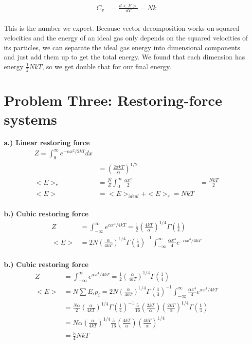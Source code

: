 \documentclass[10pt]{article} %
\begin{document}
\begin{align*}
  C_v &= \frac{d<E>}{dT} = Nk\\
\end{align*}

This is the number we expect. Because vector decomposition works on squared velocities and the
energy of an ideal gas only depends on the squared velocities of its particles, we can separate
the ideal gas energy into dimensional components and just add them up to get the total energy.
We found that each dimension has energy $\frac{1}{2}NkT$, so we get double that for our final
energy.\\

\section{Problem Three: Restoring-force systems}

\textbf{a.) Linear restoring force}
\begin{align*}
  Z = \int_0^\infty e^{-\alpha x^2/2kT}dx\\
  &= \left(\frac{2\pi kT}{\alpha}\right)^{1/2}\\
  <E>_r &= \frac{N}{Z}\int_0^\infty \frac{\alpha x^2}{2}
  &= \frac{NkT}{2}\\
  <E> &= <E>_{ideal} + <E>_r = NkT\\
\end{align*}

\textbf{b.) Cubic restoring force}
\begin{align*}
  Z &= \int_{-\infty}^{\infty}e^{\alpha x^4/4kT}
  = \frac{1}{2}\left(\frac{4kT}{\alpha}\right)^{1/4}\Gamma\left(\frac{1}{4}\right)\\
  <E> &= 2N\left(\frac{\alpha}{4kT}\right)^{1/4}\Gamma\left(\frac{1}{4}\right)^{-1}
  \int_{-\infty}^\infty \frac{\alpha x^4}{4}e^{-\alpha x^4 / 4kT}\\
\end{align*}

\textbf{b.) Cubic restoring force}
\begin{align*}
  Z &= \int_{-\infty}^{\infty}e^{\alpha x^4/4kT}
  = \frac{1}{2}\left(\frac{\alpha}{4kT}\right)^{1/4}\Gamma\left(\frac{1}{4}\right)\\
  <E> &= N\sum E_ip_i =
  2N\left(\frac{\alpha}{4kT}\right)^{1/4}\Gamma\left(\frac{1}{4}\right)^{-1}
  \int_{-\infty}^{\infty}\frac{\alpha x^4}{4}e^{\alpha x^4/4kT}\\
  &= \frac{N\alpha}{2}\left(\frac{\alpha}{4kT}\right)^{1/4}\Gamma\left(\frac{1}{4}\right)^{-1}
  \frac{5}{16}\left(\frac{2kT}{\alpha}\right)\left(\frac{2kT}{\alpha}\right)^{1/4}
  \Gamma\left(\frac{1}{4}\right)\\
  &= N\alpha\left(\frac{\alpha}{4kT}\right)^{1/4}
  \frac{5}{16}\left(\frac{4kT}{\alpha}\right)\left(\frac{4kT}{\alpha}\right)^{1/4}\\
  &= \frac{5}{4}NkT\\
\end{align*}
\end{document}
